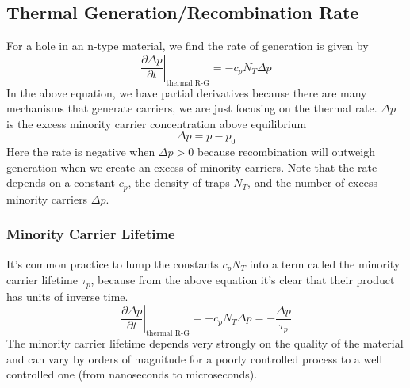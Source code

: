 \subsection{Thermal Generation/Recombination Rate}
For a hole in an n-type material, we find the rate of generation is given by
    \begin{equation}
        \left. \frac{\partial \Delta p}{\partial t} \right|_{\text{thermal R-G}} = - c_p N_T \Delta p
    \end{equation}
In the above equation, we have partial derivatives because there are many mechanisms that generate carriers, we are just focusing on the thermal rate.  $\Delta p$ is the excess minority carrier concentration above equilibrium
    \begin{equation}
        \Delta p = p - p_0
    \end{equation}
Here the rate is negative when $\Delta p > 0$ because recombination will outweigh generation when we create an excess of minority carriers.  Note that the rate depends on a constant $c_p$, the density of traps $N_T$, and the number of excess minority carriers $\Delta p$.  
\subsubsection*{Minority Carrier Lifetime}
It's common practice to lump the constants $c_p N_T$ into a term called the minority carrier lifetime $\tau_p$, because from the above equation it's clear that their product has units of inverse time.
    \begin{equation}
        \left. \frac{\partial \Delta p}{\partial t} \right|_{\text{thermal R-G}} = - c_p N_T \Delta p = - \frac{\Delta p}{\tau_p}
        \label{eq:lifetime}
    \end{equation} 
The minority carrier lifetime depends very strongly on the quality of the material and can vary by orders of magnitude for a poorly controlled process to a well controlled one (from nanoseconds to microseconds).
